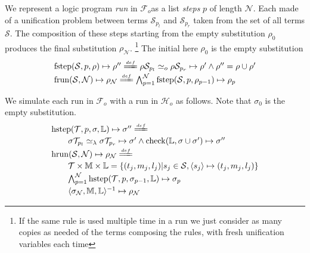 \documentclass[sigconf,natbib=false]{acmart}
\newcommand{\UnifRel}{\ensuremath{\simeq}}
\newcommand{\Uo}{\ensuremath{\UnifRel_o}\xspace}
\newcommand{\Ue}{\ensuremath{\UnifRel_\lambda}\xspace}
\newcommand{\Fo}{\ensuremath{\mathcal{F}_{\!o}\xspace}} %
\newcommand{\Ho}{\ensuremath{\mathcal{H}_o}\xspace}
\begin{document}
We represent a logic program \emph{run} in \Fo as
a list \emph{steps} $p$ of length $\mathcal{N}$. Each made of a
unification problem between terms $\mathcal{S}_{p_l}$ and
$\mathcal{S}_{p_r}$ taken from the set of all terms $\mathcal{S}$.
The composition of these steps starting from the
empty substitution $\rho_0$ produces the final
substitution $\rho_\mathcal{N}$.
\footnote{If the same rule is used multiple time in a run we
just consider as many copies as needed of the terms composing the
rules, with fresh unification variables each time}
The initial here $\rho_0$ is the empty substitution
%
\newcommand{\solve}{\ensuremath{\mathrm{check}}}
\newcommand{\fstep}{\ensuremath{\mathrm{fstep}}}
\newcommand{\hstep}{\ensuremath{\mathrm{hstep}}}
\newcommand{\frun}{\ensuremath{\mathrm{frun}}}
\newcommand{\hrun}{\ensuremath{\mathrm{hrun}}}
\newcommand{\stepF}[4]{\ensuremath{\fstep(#1,#2,#3) \mapsto #4}}
\newcommand{\stepFD}[5]{%
\ensuremath{#3 #1_{#2_l} \Uo #3 #1_{#2_r} \mapsto #4 \land #5 = #3 \cup #4}}
\newcommand{\stepH}[5]{\ensuremath{\hstep(#1,#2,#3,#4) \mapsto #5}}
\newcommand{\stepHD}[6]{\ensuremath{%
#3 #1_{#2_l} \Ue #3 #1_{#2_r} \mapsto #4 \land \solve(#6,#3 \cup #4) \mapsto #5}}
\newcommand{\runF}[3]{\ensuremath{\frun(#1,#2) \mapsto #3_{#2}}}
\newcommand{\runFD}[2]{\ensuremath{%
\bigwedge_{p = 1}^{#2} \stepF{#1}{p}{\rho_{p-1}}{\rho_{p}}}}
\newcommand{\runH}[3]{\ensuremath{\hrun(#1,#2) \mapsto #3_{#2}}}
\newcommand{\runHD}[3]{\ensuremath{%
\bigwedge_{p = 1}^{#2} \stepH{#1}{p}{\sigma_{p-1}}{#3}{\sigma_{p}}}}
\newcommand{\deff}{\ensuremath{\stackrel{{\scriptscriptstyle def}}{=\!=\!\!\!=}}}
$$
\begin{array}{l}
\stepF{\mathcal{S}}{p}{\rho}{\rho''}
\deff
\stepFD{\mathcal{S}}{p}{\rho}{\rho'}{\rho''}\vspace{2pt}\\
\runF{\mathcal{S}}{\mathcal{N}}{\rho}
\deff
\runFD{\mathcal{S}}{\mathcal{N}}
\end{array}
$$

We simulate each run in \Fo{} with a run in \Ho as follows.
Note that $\sigma_0$ is the empty substitution.
$$
\begin{array}{l}
\stepH{\mathcal{T}}{p}{\sigma}{\mathbb{L}}{\sigma''} \deff\vspace{2pt}\\
  \qquad\stepHD{\mathcal{T}}{p}{\sigma}{\sigma'}{\sigma''}{\mathbb{L}}\vspace{2pt}\\
\runH{\mathcal{S}}{\mathcal{N}}{\rho} \deff \vspace{2pt}\\
  \qquad \mathcal{T} \times \mathbb{M} \times \mathbb{L} = \{ (t_j,m_j,l_j) | s_j \in \mathcal{S}, \C{s_j}{t_j}{m_j}{l_j} \}\vspace{2pt}\\
  \qquad \runHD{\mathcal{T}}{\mathcal{N}}{\mathbb{L}}\vspace{2pt}\\
  \qquad \D{\sigma_{\mathcal{N}}}{\mathbb{M}}{\mathbb{L}}{\rho_{\mathcal{N}}}
\end{array}
$$
\end{document}

